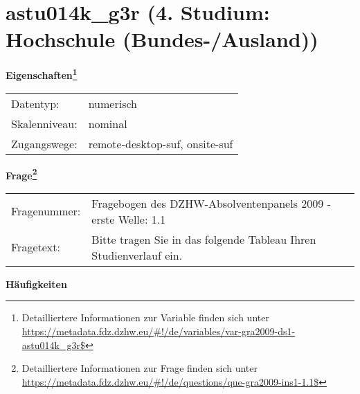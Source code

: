 
    \setcounter{footnote}{0}

    \vspace*{-1.8cm}
	\section{astu014k\_g3r (4. Studium: Hochschule (Bundes-/Ausland))}
	\label{section:astu014k_g3r}



    \vspace*{0.5cm}
    \noindent\textbf{Eigenschaften\footnote{Detailliertere Informationen zur Variable finden sich unter
		\url{https://metadata.fdz.dzhw.eu/\#!/de/variables/var-gra2009-ds1-astu014k_g3r$}}}\\
	\begin{tabularx}{\hsize}{@{}lX}
	Datentyp: & numerisch \\
	Skalenniveau: & nominal \\
	Zugangswege: &
	  remote-desktop-suf, 
	  onsite-suf
 \\
    \end{tabularx}



				\vspace*{0.5cm}
                \noindent\textbf{Frage\footnote{Detailliertere Informationen zur Frage finden sich unter
		              \url{https://metadata.fdz.dzhw.eu/\#!/de/questions/que-gra2009-ins1-1.1$}}}\\
				\begin{tabularx}{\hsize}{@{}lX}
					Fragenummer: &
					  Fragebogen des DZHW-Absolventenpanels 2009 - erste Welle:
					  1.1
 \\
					Fragetext: & Bitte tragen Sie in das folgende Tableau Ihren Studienverlauf ein. \\
				\end{tabularx}





        		\vspace*{0.5cm}
                \noindent\textbf{Häufigkeiten}

